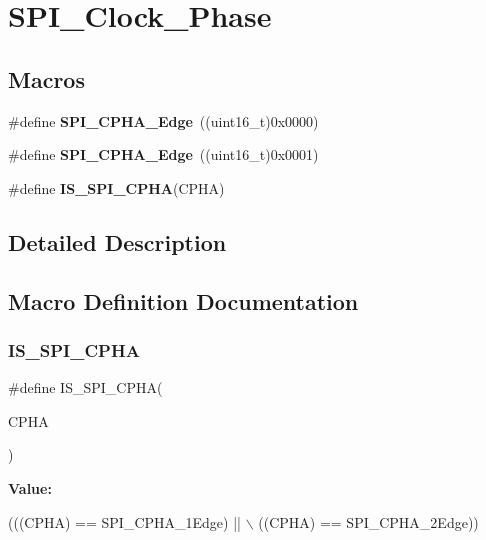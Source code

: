 \hypertarget{group___s_p_i___clock___phase}{}\section{S\+P\+I\+\_\+\+Clock\+\_\+\+Phase}
\label{group___s_p_i___clock___phase}
\subsection*{Macros}
\begin{DoxyCompactItemize}
\item 
\mbox{\label{group___s_p_i___clock___phase_gaade9d9555fac8a302bde5c94da9c7292}} 
\#define {\bfseries S\+P\+I\+\_\+\+C\+P\+H\+A\+\_\+Edge}~((uint16\+\_\+t)0x0000)
\item 
\mbox{\label{group___s_p_i___clock___phase_ga7543f88bf05a08705eb4203862dcebdf}} 
\#define {\bfseries S\+P\+I\+\_\+\+C\+P\+H\+A\+\_\+Edge}~((uint16\+\_\+t)0x0001)
\item 
\#define {\bfseries I\+S\+\_\+\+S\+P\+I\+\_\+\+C\+P\+HA}(C\+P\+HA)
\end{DoxyCompactItemize}


\subsection{Detailed Description}


\subsection{Macro Definition Documentation}
\mbox{\label{group___s_p_i___clock___phase_ga6441f08edf79dd5b243c54b888d3cbf7}} 
\subsubsection{\texorpdfstring{I\+S\+\_\+\+S\+P\+I\+\_\+\+C\+P\+HA}{IS\_SPI\_CPHA}}
{\footnotesize\ttfamily \#define I\+S\+\_\+\+S\+P\+I\+\_\+\+C\+P\+HA(\begin{DoxyParamCaption}\item[{}]{C\+P\+HA }\end{DoxyParamCaption})}

{\bfseries Value\+:}
\begin{DoxyCode}
(((CPHA) == SPI\_CPHA\_1Edge) || \(\backslash\)
                           ((CPHA) == SPI\_CPHA\_2Edge))
\end{DoxyCode}
